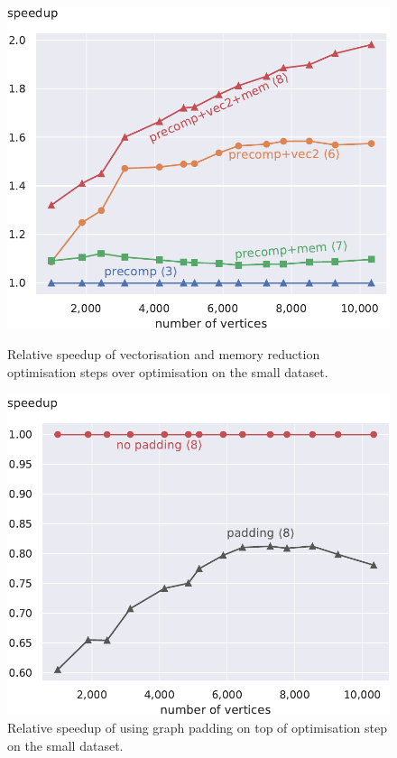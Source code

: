 \documentclass[final,letterpaper]{article}
\begin{document}
\begin{figure}[!t]
\begin{minipage}[t]{\oldlinewidth}\centering
	\includegraphics[width=\linewidth]{img/speedup[3][6][7][8]_small.pdf}
	\caption{Relative speedup of vectorisation and memory reduction optimisation steps over optimisation  on the small dataset. \label{cpctVectSpeedupSmall}}
\end{minipage}%
\hspace{7.2mm}
\begin{minipage}[t]{\oldlinewidth}\centering
	\includegraphics[width=\linewidth]{img/speedup[8]padding_small.pdf}
	\caption{Relative speedup of using graph padding on top of optimisation step  on the small dataset. \label{speedupGraphPaddingSmall}}
\end{minipage}%


\end{figure}
\end{document}
